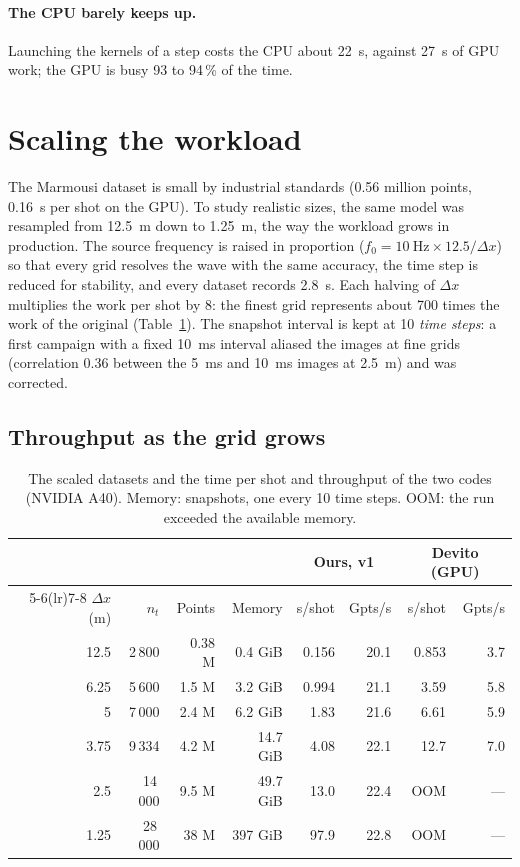 \documentclass[letterpaper,11pt,leqno]{article}
\begin{document}
\paragraph{The CPU barely keeps up.} Launching the kernels of a step costs the CPU about 22~\textmu s, against 27~\textmu s of GPU work; the GPU is busy 93 to 94\,\% of the time.

\section{Scaling the workload}\label{s:scaling-section}

The Marmousi dataset is small by industrial standards (0.56 million points, 0.16~s per shot on the GPU). To study realistic sizes, the same model was resampled from 12.5~m down to 1.25~m, the way the workload grows in production. The source frequency is raised in proportion ($f_0 = 10~\text{Hz} \times 12.5/\Delta x$) so that every grid resolves the wave with the same accuracy, the time step is reduced for stability, and every dataset records 2.8~s. Each halving of $\Delta x$ multiplies the work per shot by 8: the finest grid represents about 700 times the work of the original (Table~\ref{tab:scaling}). The snapshot interval is kept at 10 \emph{time steps}: a first campaign with a fixed 10~ms interval aliased the images at fine grids (correlation $0.36$ between the 5~ms and 10~ms images at 2.5~m) and was corrected.

\subsection{Throughput as the grid grows}\label{s:scaling}

\begin{table}[!htb]
\centering
\caption{The scaled datasets and the time per shot and throughput of the two codes (NVIDIA A40). Memory: snapshots, one every 10 time steps. OOM: the run exceeded the available memory.}
\label{tab:scaling}
\begin{tabular}{rrrrrrrr}
\toprule
 & & & & \multicolumn{2}{c}{Ours, v1} & \multicolumn{2}{c}{Devito (GPU)} \\
\cmidrule(lr){5-6}\cmidrule(lr){7-8}
$\Delta x$ (m) & $n_t$ & Points & Memory & s/shot & Gpts/s & s/shot & Gpts/s \\
\midrule
12.5 & 2\,800  & 0.38 M & 0.4 GiB  & 0.156 & 20.1 & 0.853 & 3.7 \\
6.25 & 5\,600  & 1.5 M  & 3.2 GiB  & 0.994 & 21.1 & 3.59  & 5.8 \\
5    & 7\,000  & 2.4 M  & 6.2 GiB  & 1.83  & 21.6 & 6.61  & 5.9 \\
3.75 & 9\,334  & 4.2 M  & 14.7 GiB & 4.08  & 22.1 & 12.7  & 7.0 \\
2.5  & 14\,000 & 9.5 M  & 49.7 GiB & 13.0  & 22.4 & OOM   & --- \\
1.25 & 28\,000 & 38 M   & 397 GiB  & 97.9  & 22.8 & OOM   & --- \\
\bottomrule
\end{tabular}
\end{table}
\end{document}

